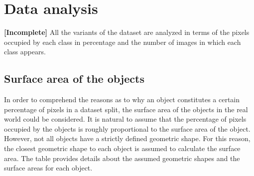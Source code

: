 \section{Data analysis}
\label{section:analysis}

\textbf{[Incomplete]}
	All the variants of the dataset are analyzed in terms of the pixels occupied by each class in percentage and the number of images in which each class appears. 
	
	\subsection{Surface area of the objects}
		
		In order to comprehend the reasons as to why an object constitutes a certain percentage of pixels in a dataset split, the surface area of the objects in the real world could be considered. It is natural to assume that the percentage of pixels occupied by the objects is roughly proportional to the surface area of the object. However, not all objects have a strictly defined geometric shape. For this reason, the closest geometric shape to each object is assumed to calculate the surface area. The table provides details about the assumed geometric shapes and the surface areas for each object.
		
